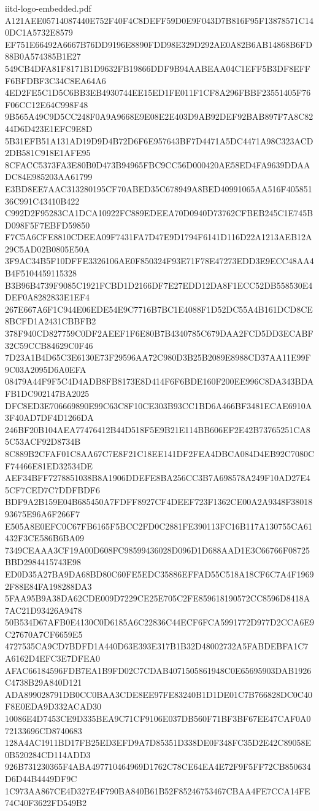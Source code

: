 \begin{filecontents*}[overwrite]{iitd-logo-embedded.pdf}
A121AEE05714087440E752F40F4C8DEFF59D0E9F043D7B816F95F13878571C140DC1A5732E8579
EF751E66492A6667B76DD9196E8890FDD98E329D292AE0A82B6AB14868B6FD88B0A574385B1E27
549CB4DFA81F8171B1D9632FB19866DDF9B94AABEAA04C1EFF5B3DF8EFFF6BFDBF3C34C8EA64A6
4ED2FE5C1D5C6BB3EB4930744EE15ED1FE011F1CF8A296FBBF23551405F76F06CC12E64C998F48
9B565A49C9D5CC248F0A9A9668E9E08E2E403D9AB92DEF92BAB897F7A8C8244D6D423E1EFC9E8D
5B31EFB51A131AD19D9D4B72D6F6E957643BF7D4471A5DC4471A98C323ACD2DB581C918E1AFE95
8CFACC5373FA3E80B0D473B94965FBC9CC56D000420AE58ED4FA9639DDAADC84E985203AA61799
E3BD8EE7AAC313280195CF70ABED35C678949A8BED40991065AA516F40585136C991C43410B422
C992D2F95283CA1DCA10922FC889EDEEA70D0940D73762CFBEB245C1E745BD098F5F7EBFD59850
F7C5A6CFE8810CDEEA09F7431FA7D47E9D1794F6141D116D22A1213AEB12A29C5AD02B0805E50A
3F9AC34B5F10DFFE3326106AE0F850324F93E71F78E47273EDD3E9ECC48AA4B4F5104459115328
B3B96B4739F9085C1921FCBD1D2166DF7E27EDD12DA8F1ECC52DB558530E4DEF0A8282833E1EF4
267E667A6F1C944E06EDE54E9C7716B7BC1E4088F1D52DC55A4B161DCD8CE8BCFD1A2431CBBFB2
378F940CD827759C0DF2AEEF1F6E80B7B4340785C679DAA2FCD5DD3ECABF32C59CCB84629C0F46
7D23A1B4D65C3E6130E73F29596AA72C980D3B25B2089E8988CD37AA11E99F9C03A2095D6A0EFA
08479A44F9F5C4D4ADB8FB8173E8D414F6F6BDE160F200EE996C8DA343BDAFB1DC902147BA2025
DFC8ED3E706669890E99C63C8F10CE303B93CC1BD6A466BF3481ECAE6910A3F40AD7DF4D1266DA
246BF20B104AEA77476412B44D518F5E9B21E114BB606EF2E42B73765251CA85C53ACF92D8734B
8C889B2CFAF01C8AA67C7E8F21C18EE141DF2FEA4DBCA084D4EB92C7080CF74466E81ED32534DE
AEF34BFF7278851038B8A1906DDEFE8BA256CC3B7A698578A249F10AD27E45CF7CED7C7DDFBDF6
BDF9A2B159E04B685450A7FDFF8927CF4DEEF723F1362CE00A2A9348F3801893675E96A6F266F7
E505A8E0EFC0C67FB6165F5BCC2FD0C2881FE390113FC16B117A130755CA61432F3CE586B6BA09
7349CEAAA3CF19A00D608FC98599436028D096D1D688AAD1E3C66766F08725BBD2984415743E98
ED0D35A27BA9DA68BD80C60FE5EDC35886EFFAD55C518A18CF6C7A4F19692F88E84FA198288DA3
5FAA95B9A38DA62CDE009D7229CE25E705C2FE859618190572CC8596D8418A7AC21D93426A9478
50B534D67AFB0E4130C0D6185A6C22836C44ECF6FCA5991772D977D2CCA6E9C27670A7CF6659E5
4727535CA9CD7BDFD1A440D63E393E317B1B32D48002732A5FABDEBFA1C7A6162D4EFC3E7DFEA0
AFAC66184596FDB7EA1B9FD02C7CDAB4071505861948C0E65695903DAB1926C4738B29A840D121
ADA899028791DB0CC0BAA3CDE8EE97FE83240B1D1DE01C7B766828DC0C40F8E0EDA9D332ACAD30
10086E4D7453CE9D335BEA9C71CF9106E037DB560F71BF3BF67EE47CAF0A072133696CD8740683
128A4AC1911BD17FB25ED3EFD9A7D85351D338DE0F348FC35D2E42C89058E0B520284CD114ADD3
926B731230365F4ABA497710464969D1762C78CE64EA4E72F9F5FF72CB850634D6D44B4449DF9C
1C973AA867CE4D327E4F790BA840B61B52F85246753467CBAA4FE7CCA14FE74C40F3622FD549B2

\end{filecontents*}
